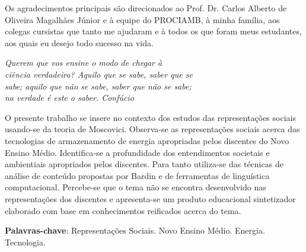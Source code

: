 \documentclass[
  12pt,       %
  openright,      %
  twoside,      %
  a4paper,      %
  english,      %
  french,       %
  spanish,      %
  brazil        %
  ]{abntex2}
\begin{document}
\begin{agradecimentos}
Os agradecimentos principais são direcionados ao Prof. Dr. Carlos Alberto de Oliveira Magalhães Júnior e à equipe do PROCIAMB, à minha família, aos colegas cursistas que tanto me ajudaram e à todos os que foram meus estudantes, aos quais eu desejo todo sucesso na vida.

\end{agradecimentos}

\begin{epigrafe}
    \vspace*{\fill}
  \begin{flushright}
    \textit{Querem que vos ensine o modo de chegar à \\
    ciência verdadeira? Aquilo que se sabe, saber que se \\
    sabe; aquilo que não se sabe, saber que não se sabe; \\
    na verdade é este o saber. Confúcio}
  \end{flushright}
\end{epigrafe}


\setlength{\absparsep}{18pt} %
\begin{resumo}
 O presente trabalho se insere no contexto dos estudos das representações sociais usando-se da teoria de Moscovici. Observa-se as representações sociais acerca das tecnologias de armazenamento de energia apropriadas pelos discentes do Novo Ensino Médio. Identifica-se a profundidade dos entendimentos societais e ambientiais apropriados pelos discentes. Para tanto utiliza-se das técnicas de análise de conteúdo propostas por Bardin e de ferramentas de linguística computacional. Percebe-se que o tema não se encontra desenvolvido nas representações dos discentes e apresenta-se um produto educacional sintetizador elaborado com base em conhecimentos reificados acerca do tema.

 \textbf{Palavras-chave}: Representações Sociais. Novo Ensino Médio. Energia. Tecnologia.
\end{resumo}
\end{document}
